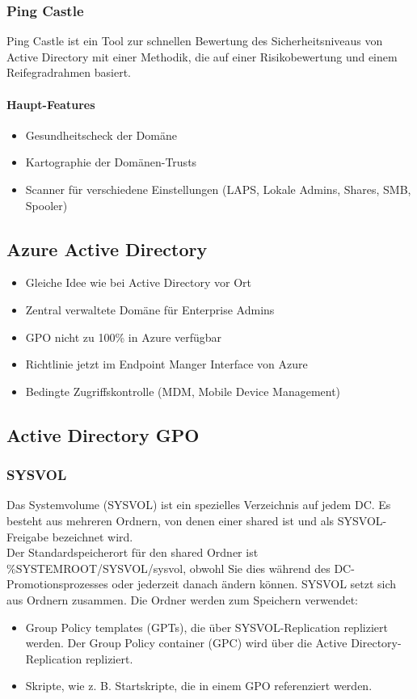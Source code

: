 \subsubsection{Ping Castle}
Ping Castle ist ein Tool zur schnellen Bewertung des Sicherheitsniveaus von Active Directory mit einer Methodik, die auf einer Risikobewertung und einem Reifegradrahmen basiert.\\
\paragraph{Haupt-Features}
\begin{itemize}
  \item Gesundheitscheck der Domäne
  \item Kartographie der Domänen-Trusts
  \item Scanner für verschiedene Einstellungen (LAPS, Lokale Admins, Shares, SMB, Spooler)
\end{itemize}

\subsection{Azure Active Directory}
\begin{itemize}
  \item Gleiche Idee wie bei Active Directory vor Ort
  \item Zentral verwaltete Domäne für Enterprise Admins
  \item GPO nicht zu 100\% in Azure verfügbar
  \item Richtlinie jetzt im Endpoint Manger Interface von Azure
  \item Bedingte Zugriffskontrolle (MDM, Mobile Device Management)
\end{itemize}



\subsection{Active Directory GPO}
\subsubsection{SYSVOL}
Das Systemvolume (SYSVOL) ist ein spezielles Verzeichnis auf jedem DC.
Es besteht aus mehreren Ordnern, von denen einer shared ist und als SYSVOL-Freigabe bezeichnet wird.\\

Der Standardspeicherort für den shared Ordner ist \%SYSTEMROOT/SYSVOL/sysvol, obwohl Sie dies während des DC-Promotionsprozesses oder jederzeit danach ändern können.
SYSVOL setzt sich aus Ordnern zusammen. 
Die Ordner werden zum Speichern verwendet:
\begin{itemize}
  \item Group Policy templates (GPTs), die über SYSVOL-Replication repliziert werden. Der Group Policy container (GPC) wird über die Active Directory-Replication repliziert.
  \item Skripte, wie z. B. Startskripte, die in einem GPO referenziert werden.
\end{itemize}

